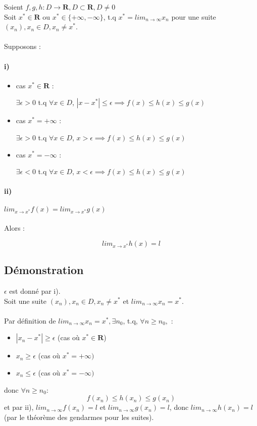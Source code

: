 \documentclass{article}
\begin{document}
Soient $ f, g, h: D \to \mathbf{R}, D \subset \mathbf{R}, D \neq 0 $\\
Soit $ x^* \in \mathbf{R} $ ou $ x^* \in \{+\infty, -\infty\}$, t.q $ x^* = lim_{n\to\infty} x_n $ pour une suite $ (x_n), x_n \in D, x_n \neq x^* $.\\\\
Supposons :

\paragraph{i)}

\begin{itemize}
    \item cas $ x^* \in \mathbf{R} $ :

$ \exists \epsilon > 0 $ t.q $ \forall x \in D $, $ |x-x^*| \leq \epsilon \implies f(x) \leq h(x) \leq g(x) $

\item cas $ x^* = +\infty $ :

$ \exists \epsilon > 0 $ t.q $ \forall x \in D $, $ x > \epsilon \implies f(x) \leq h(x) \leq g(x) $

\item cas $ x^* = -\infty $ :

$ \exists \epsilon < 0 $ t.q $ \forall x \in D $, $ x < \epsilon \implies f(x) \leq h(x) \leq g(x) $

\end{itemize}

\paragraph{ii)}

$ lim_{x\to{x^*}} f(x) = lim_{x\to{x^*}} g(x) $\\\\
Alors : 

\[ lim_{x\to{x^*}} h(x) = l \]

\subsection{Démonstration}

$ \epsilon $ est donné par i).\\
Soit une suite $ (x_n), x_n \in D, x_n \neq x^* $ et $ lim_{n\to\infty} x_n = x^* $.\\\\
Par définition de $ lim_{n\to\infty} x_n = x^*, \exists n_0 $, t.q, $ \forall n \geq n_0, $ :
\begin{itemize}
    \item $ |x_n - x^*| \geq \epsilon $ (cas où $ x^* \in \mathbf{R} $)
    \item $ x_n \geq \epsilon $ (cas où $ x^* = +\infty)$
    \item $ x_n \leq \epsilon $ (cas où $ x^* = -\infty)$
\end{itemize}
donc $ \forall n \geq n_0 $:
\[ f(x_n) \leq h(x_n) \leq g(x_n) \]
et par ii), $ lim_{n\to\infty} f(x_n) = l $ et $ lim_{n\to\infty} g(x_n) = l $, donc $ lim_{n\to\infty} h(x_n) = l $ (par le théorème des gendarmes pour les suites).
\end{document}
